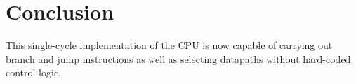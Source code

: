\documentclass[twocolumn]{article}
\begin{document}
\section{Conclusion}

This single-cycle implementation of the CPU is now capable of carrying out branch and jump instructions as well as selecting datapaths without hard-coded control logic. 




\printbibliography
\end{document}
